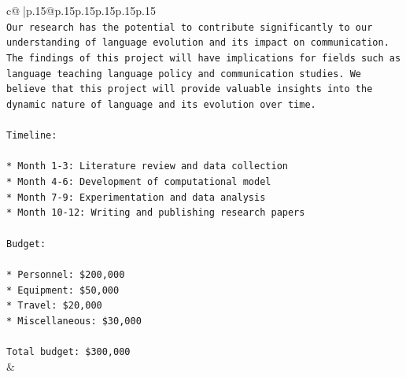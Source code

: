 \documentclass{article}
\begin{document}
{\begin{supertabular}{c@{$\;$}|p{.15\linewidth}@{}p{.15\linewidth}p{.15\linewidth}p{.15\linewidth}p{.15\linewidth}p{.15\linewidth}}
{{{\\ 
\texttt{Our research has the potential to contribute significantly to our understanding of language evolution and its impact on communication. The findings of this project will have implications for fields such as language teaching language policy and communication studies. We believe that this project will provide valuable insights into the dynamic nature of language and its evolution over time.} \\
\\ 
\texttt{Timeline:} \\
\\ 
\texttt{* Month 1{-}3: Literature review and data collection} \\
\texttt{* Month 4{-}6: Development of computational model} \\
\texttt{* Month 7{-}9: Experimentation and data analysis} \\
\texttt{* Month 10{-}12: Writing and publishing research papers} \\
\\ 
\texttt{Budget:} \\
\\ 
\texttt{* Personnel: \$200,000} \\
\texttt{* Equipment: \$50,000} \\
\texttt{* Travel: \$20,000} \\
\texttt{* Miscellaneous: \$30,000} \\
\\ 
\texttt{Total budget: \$300,000} \\
            }
        }
    }
    & \\ \\


\end{supertabular}}
\end{document}
